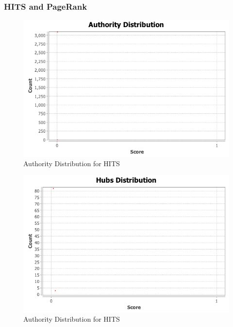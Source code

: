 \subsubsection{HITS and PageRank}
\begin{figure}[!ht]    
    \begin{center}
        \includegraphics[scale=0.60]{q3/HITS/authorities.png}
        \caption{Authority Distribution for HITS}
        \label{fig:q3-4}
    \end{center}
\end{figure}
\begin{figure}[!ht]    
    \begin{center}
        \includegraphics[scale=0.60]{q3/HITS/hubs.png}
        \caption{Authority Distribution for HITS}
        \label{fig:q3-5}
    \end{center}
\end{figure}
